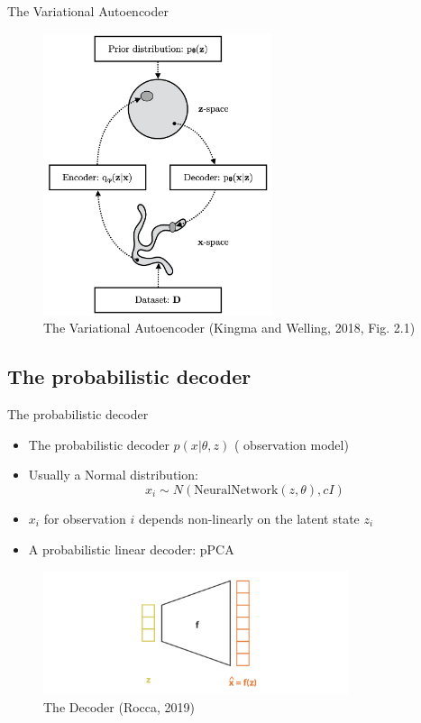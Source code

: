 \documentclass[10pt]{beamer}
\begin{document}
\begin{frame}{The Variational Autoencoder}

\begin{figure}[h]
\centering
\includegraphics[width=0.6\textwidth]{fig/Kingma_Welling_2018_Fig_2_1.png}
\caption{The Variational Autoencoder (Kingma and Welling, 2018, Fig. 2.1)}
\end{figure}

\end{frame}


\subsection{The probabilistic decoder}

\begin{frame}{The probabilistic decoder}
\begin{itemize}
\item The probabilistic decoder $p(x|\theta, z)$ ({\color{uured} observation model})
\item Usually a Normal distribution:
\[
x_i \sim N(\text{NeuralNetwork}(z,\theta), c I)
\]
\item $x_i$ for observation $i$ depends non-linearly on the latent state $z_i$
\pause
\item A probabilistic linear decoder: {\color{uured} pPCA}
\end{itemize}

\begin{figure}[h]
\centering
\includegraphics[width=0.8\textwidth]{fig/Rocca_VAE_decoder.png}
\caption{The Decoder (Rocca, 2019)}
\end{figure}

\end{frame}
\end{document}
